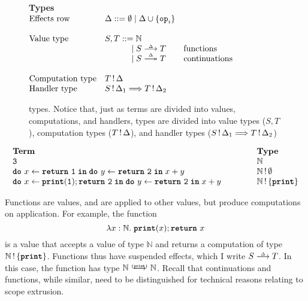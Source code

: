 \begin{figure}
  \begin{eff-desc}
  {\large \textbf{Types}}\\

  $\begin{array}{@{}lllr}
    \text{Effects row} & \Delta ::= \emptyset \mid \Delta \cup \{ \texttt{op}_i \} \\ \\
    \text{Value type} & S, T ::= \mathbb{N} & \\
                              &\quad\quad\quad\,\mid \functionType{S}{T} & \text{functions}\\
                              &\quad\quad\quad\,\mid \continuationType{S}{T} & \text{continuations}\\ \\
    \text{Computation type} & \effectType{T} \\
    \text{Handler type} & \handlerType{\effectType[\Delta_1]{S}}{\effectType[\Delta_2]{T}}
  \end{array}$
  \end{eff-desc}
  \caption{\efflang{} types. Notice that, just as terms are divided into values, computations, and handlers, types are divided into value types ($S, T$), computation types ($\effectType{T}$), and handler types ($\handlerType{\effectType[\Delta_1]{S}}{\effectType[\Delta_2]{T}}$)}
  \label{fig:efflang-type-syntax}
\end{figure}

\[
\begin{array}{lll}
  \textbf{Term} &\hspace{8mm}& \textbf{Type} \\
  \texttt{3} && \mathbb{N} \\ 
  \bind{x}{\return{\texttt{1}}}{\bind{y}{\return{\texttt{2}}}{x + y}} &&  \effectType[\emptyset]{\mathbb{N}} \\ 
  \bind{x}{\print{1}; \return{\texttt{2}}}{\bind{y}{\return{\texttt{2}}}{x + y}} &&  \effectType[\{ \texttt{\textbf{print}}\}]{\mathbb{N}} \\ 
\end{array}
\]

Functions are values, and are applied to other values, but produce computations on application. For example, the function 
\[
\function{x:\mathbb{N}}{\; \textbf{\texttt{print}}(x); \return{x}}
\]
is a value that accepts a value of type $\mathbb{N}$ and returns a computation of type $\effectType[\{\textbf{\texttt{print}} \}]{\mathbb{N}}$. Functions thus have suspended effects, which I write $\functionType{S}{T}$. In this case, the function has type $\functionType[\{ \textbf{\texttt{print}} \}]{\mathbb{N}}{\mathbb{N}}$. Recall that continuations and functions, while similar, need to be distinguished for technical reasons relating to scope extrusion. 


